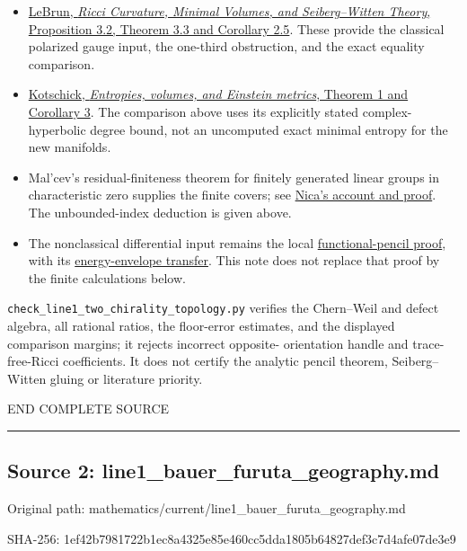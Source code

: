 \documentclass[
  10pt,
]{article}
\providecommand{\tightlist}{%
  \setlength{\itemsep}{0pt}\setlength{\parskip}{0pt}}
\begin{document}
\begin{itemize}
\tightlist
\item
  \href{https://arxiv.org/html/math/0003068}{LeBrun, \emph{Ricci
  Curvature, Minimal Volumes, and Seiberg--Witten Theory}, Proposition
  3.2, Theorem 3.3 and Corollary 2.5}. These provide the classical
  polarized gauge input, the one-third obstruction, and the exact
  equality comparison.
\item
  \href{https://arxiv.org/html/math/0410215}{Kotschick, \emph{Entropies,
  volumes, and Einstein metrics}, Theorem 1 and Corollary 3}. The
  comparison above uses its explicitly stated complex-hyperbolic degree
  bound, not an uncomputed exact minimal entropy for the new manifolds.
\item
  Mal'cev's residual-finiteness theorem for finitely generated linear
  groups in characteristic zero supplies the finite covers; see
  \href{https://arxiv.org/abs/1306.2385}{Nica's account and proof}. The
  unbounded-index deduction is given above.
\item
  The nonclassical differential input remains the local
  \href{line1_functional_pencil.md}{functional-pencil proof}, with its
  \href{line1_energy_envelope_gap.md}{energy-envelope transfer}. This
  note does not replace that proof by the finite calculations below.
\end{itemize}

\texttt{check\_line1\_two\_chirality\_topology.py} verifies the
Chern--Weil and defect algebra, all rational ratios, the floor-error
estimates, and the displayed comparison margins; it rejects incorrect
opposite- orientation handle and trace-free-Ricci coefficients. It does
not certify the analytic pencil theorem, Seiberg--Witten gluing or
literature priority.

END COMPLETE SOURCE

\begin{center}\rule{0.5\linewidth}{0.5pt}\end{center}

\hypertarget{source-2-line1_bauer_furuta_geography.md}{%
\subsection{Source 2:
line1\_bauer\_furuta\_geography.md}\label{source-2-line1_bauer_furuta_geography.md}}

Original path: mathematics/current/line1\_bauer\_furuta\_geography.md

SHA-256:
1ef42b7981722b1ec8a4325e85e460cc5dda1805b64827def3c7d4afe07de3e9
\end{document}

